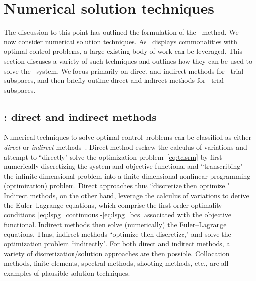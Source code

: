 \section{Numerical solution techniques}\label{sec:numerical_techniques}
The discussion to this point has outlined the formulation of the \methodAcronym\ method. We now consider numerical solution techniques. 
As \methodAcronym\ displays commonalities with optimal control problems, a large existing body of work can be leveraged. This section discuses a variety of such techniques and outlines how they can be used to solve the \methodAcronym\ system. We focus primarily on direct and indirect methods for \spatialAcronym\ trial subspaces, 
and then briefly outline direct and indirect methods for \spaceTimeAcronym\ trial subspaces. 

\subsection{\spatialAcronym: direct and indirect methods}
Numerical techniques to
solve optimal control problems can be classified as either
\textit{direct} or \textit{indirect}
methods~\cite{conway_optimalcontrolreview}. Direct method eschew the calculus of variations 
and attempt to ``directly" solve the optimization problem~\eqref{eq:tclsrm} by first
numerically discretizing the system and objective functional and ``transcribing"
the infinite dimensional problem into a finite-dimensional nonlinear
programming (optimization) problem. Direct approaches thus ``discretize then optimize."
Indirect methods, on the other hand, leverage the calculus of variations to
derive the Euler--Lagrange equations, which comprise the first-order optimality conditions~\eqref{eq:lspg_continuous}-\eqref{eq:lspg_bcs} associated with the objective 
functional. Indirect methods then solve (numerically) the Euler--Lagrange equations. Thus, indirect methods ``optimize then discretize," and 
solve the optimization problem
``indirectly". For both direct and indirect methods, a variety of
discretization/solution approaches are then possible. Collocation methods,
finite elements, spectral methods, shooting methods, etc., are all examples of
plausible solution techniques.  

